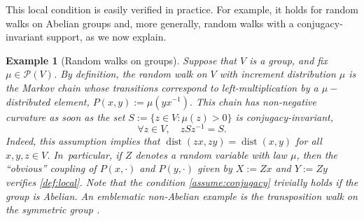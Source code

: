 \documentclass[JEP,XML,SOM,Unicode,NoEqCountersInSection,published]{cedram}
\newtheorem{example}{Example}
\theoremstyle{definition}
\newcommand{\cP}{\mathcal{P}}
\DeclareMathOperator{\dist}{dist}
\begin{document}
This local condition is easily verified in practice. For example, it holds for random walks on Abelian groups and, more generally, random walks with a conjugacy-invariant support, as we now explain.
\begin{example}[Random walks on groups] Suppose that $V$ is a group, and fix $\mu\in\cP(V)$. By definition, the \emph{random walk} on $V$ with increment distribution $\mu$ is the Markov chain whose transitions correspond to left-multiplication by a $\mu-$distributed element, \ie
$
P(x,y) := \mu(y x^{-1}).
$
This chain has non-negative curvature as soon as the set $S:=\{z\in V\colon\mu(z)>0\}$ is \emph{conjugacy-invariant}, \ie
\begin{equation}
\label{assume:conjugacy}
\forall z\in V,\quad z S z^{-1} = S.
\end{equation}
Indeed, this assumption implies that $\dist(zx,zy)=\dist(x,y)$ for all $x,y,z\in V$. In~particular, if $Z$ denotes a random variable with law $\mu$, then the ``obvious'' coupling of $P(x,\cdot)$ and $P(y,\cdot)$ given by $X:=Zx$ and $Y:=Zy$ verifies \eqref{def:local}. Note that the condition \eqref{assume:conjugacy} trivially holds if the group is Abelian. An emblematic non-Abelian example is the transposition walk on the symmetric group \cite{MR3936154}.
\end{example}
\end{document}
